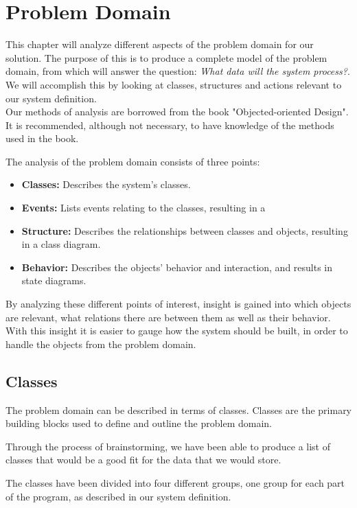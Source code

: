 \section{Problem Domain}

This chapter will analyze different aspects of the problem domain for our solution. The purpose of this is to produce a complete model of the problem domain, from which will answer the question: \textit{What data will the system process?}. 
We will accomplish this by looking at classes, structures and actions relevant to our system definition. \\
Our methods of analysis are borrowed from the book "Objected-oriented Design"\citep{FACTORPage}. It is recommended, although not necessary, to have knowledge of the methods used in the book. %

The analysis of the problem domain consists of three points:
\begin{itemize}
\item \textbf{Classes:} Describes the system's classes.
\item \textbf{Events:} Lists events relating to the classes, resulting in a  
\item \textbf{Structure:} Describes the relationships between classes and objects, resulting in a class diagram.
\item \textbf{Behavior:} Describes the objects' behavior and interaction, and results in state diagrams.
\end{itemize}

By analyzing these different points of interest, insight is gained into which objects are relevant, what relations there are between them as well as their behavior.
With this insight it is easier to gauge how the system should be built, in order to handle the objects from the problem domain.

\subsection{Classes}

The problem domain can be described in terms of classes. Classes are the primary building blocks used to define and outline the problem domain. 

Through the process of brainstorming, we have been able to produce a list of classes that would be a good fit for the data that we would store.

The classes have been divided into four different groups, one group for each part of the program, as described in our system definition.

